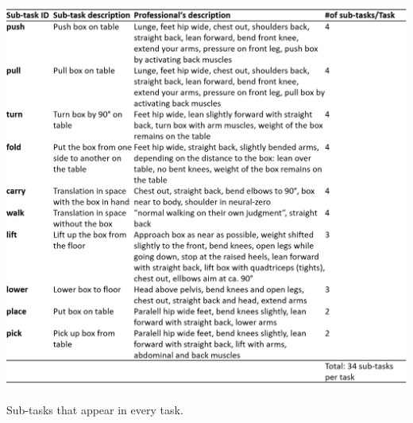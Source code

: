 \begin{table}[H]
	\centering
	\includegraphics[width=\textwidth]{figures/sub_tasks_definition.png}
	\caption[Description of sub-tasks]{Sub-tasks that appear in every task.}
	\label{tab:sub-tasks}
\end{table}


